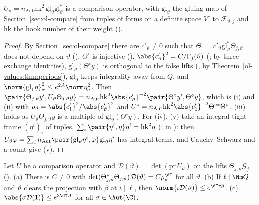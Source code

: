 \begin{theorem}\label{ol-values:thm:comp}
$U_\vartheta=n_{\mathrm{Aut}}\mathrm{hk}^2\,\mathrm{gl}_\vartheta\mathrm{gl}_\vartheta^*$ is a comparison
operator, with $\mathrm{gl}_\vartheta$ the gluing map of Section~\ref{sec:ol-compare} from tuples
of forms on a definite space $V^\circ$ to $\mathcal F_{\vartheta,j}$ and $\mathrm{hk}$ the hook number of
their weight ().
\end{theorem}

\begin{proof}
By Section~\ref{sec:ol-compare} there are $c'_\vartheta\ne0$ such that
$\Theta^\circ=c'_\vartheta\mathrm{gl}_\vartheta^*\Theta_{j,\vartheta}$ does not depend on $\vartheta$
(), $\Theta^\circ$ is injective
(), $\abs{c'_\vartheta}^2=C/\Gamma_j(\vartheta)$
(; by three exchange identities),
$\mathrm{gl}_\vartheta(\Theta^\circ y)$ is orthogonal
to the false lifts (, by
Theorem~\ref{ol-values:thm:periods}), $\mathrm{gl}_\vartheta$ keeps integrality away from $Q$, and
$\norm{\mathrm{gl}_1\eta}^2_\sigma\le e^{2A}\norm\eta^2_\sigma$. Then
$\pair{\Theta_{j,\vartheta}y',U_\vartheta\Theta_{j,\vartheta}y}=n_{\mathrm{Aut}}\mathrm{hk}^2
\abs{c'_\vartheta}^{-2}\pair{\Theta^\circ y',\Theta^\circ y}$, which is (i) and (ii) with
$\rho_\vartheta=\abs{c'_1}^2/\abs{c'_\vartheta}^2$ and
$U^\circ=n_{\mathrm{Aut}}\mathrm{hk}^2\abs{c'_1}^{-2}\Theta^{\circ*}\Theta^\circ$. (iii) holds as
$U_\vartheta\Theta_{j,\vartheta}y$ is a multiple of $\mathrm{gl}_\vartheta(\Theta^\circ y)$. For (iv),
(v) take an integral tight frame $(\eta^i)_i$ of tuples, $\sum_i\pair{\eta^i,\eta}\eta^i=\mathrm{hk}^2\eta$
(;  in ): then
$U_\vartheta\varphi=\sum_in_{\mathrm{Aut}}\pair{\mathrm{gl}_\vartheta\eta^i,\varphi}\mathrm{gl}_\vartheta
\eta^i$ has integral terms, and Cauchy--Schwarz and a count give (v).
\end{proof}

\begin{lemma}\label{ol-values:lem:det}
Let $U$ be a comparison operator and $\mathcal D(\vartheta)=\det(\mathrm{pr}\,U_\vartheta)$ on the lifts
$\Theta_{j,\vartheta}\mathcal G_j$ (). (a) There is $C\ne0$ with
$\det(\Theta^*_{j,\vartheta}\Theta_{j,\vartheta})\,\mathcal D(\vartheta)=C\rho_\vartheta^{\dT}$ for all
$\vartheta$. (b) If $\ell\nmid\Nm Q$ and $\vartheta$ clears the projection with $\beta$ at
$\iota\mid\ell$, then $\norm{\iota\mathcal D(\vartheta)}\le e^{\dT r\beta}$. (c)
$\abs{\sigma\mathcal D(1)}\le e^{3\dT A}$ for all $\sigma\in\Aut(\C)$.
\end{lemma}

